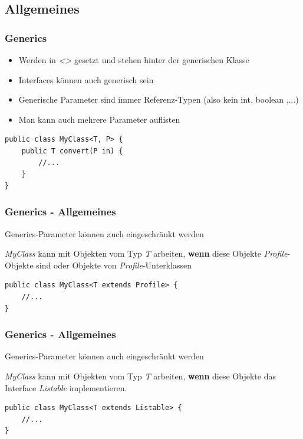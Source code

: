 \documentclass[18pt]{beamer}
\begin{document}

\subsection*{Allgemeines}
\begin{frame}[containsverbatim]
	\frametitle{Generics}
	\begin{itemize}
		\item Werden in \emph{\textless \textgreater} gesetzt und stehen hinter der generischen Klasse
		\item Interfaces können auch generisch sein
		\item Generische Parameter sind immer Referenz-Typen (also kein int, boolean ,...)
		\item Man kann auch mehrere Parameter auflisten
	\end{itemize}
	
	\begin{lstlisting}
public class MyClass<T, P> {
	public T convert(P in) {
		//...
	}
}
	\end{lstlisting}
\end{frame}


\begin{frame}[containsverbatim]
	\frametitle{Generics - Allgemeines}
	Generics-Parameter können auch eingeschränkt werden
	
	\emph{MyClass} kann mit Objekten vom Typ \emph{T} arbeiten, \textbf{wenn} diese Objekte \emph{Profile}-Objekte sind oder Objekte von \emph{Profile}-Unterklassen
	\begin{lstlisting}
public class MyClass<T extends Profile> {
	//...
}
	\end{lstlisting}
\end{frame}


\begin{frame}[containsverbatim]
	\frametitle{Generics - Allgemeines}
	Generics-Parameter können auch eingeschränkt werden
	
	\emph{MyClass} kann mit Objekten vom Typ \emph{T} arbeiten, \textbf{wenn} diese Objekte das Interface \emph{Listable} implementieren.
	\begin{lstlisting}
public class MyClass<T extends Listable> {
	//...
}
	\end{lstlisting}
\end{frame}
\end{document}
